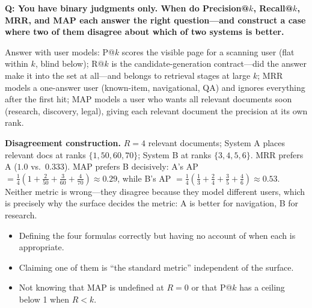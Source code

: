 \begin{interviewq}
\textbf{Q: You have binary judgments only. When do Precision@$k$, Recall@$k$, MRR, and MAP each answer the right question---and construct a case where two of them disagree about which of two systems is better.}

 \quad {} \quad \badgefreq{\freqmed}

\stronganswer

Answer with user models: P@$k$ scores the visible page for a scanning user (flat within $k$, blind below); R@$k$ is the candidate-generation contract---did the answer make it into the set at all---and belongs to retrieval stages at large $k$; MRR models a one-answer user (known-item, navigational, QA) and ignores everything after the first hit; MAP models a user who wants all relevant documents soon (research, discovery, legal), giving each relevant document the precision at its own rank.

\textbf{Disagreement construction.} $R = 4$ relevant documents; System A places relevant docs at ranks $\{1, 50, 60, 70\}$; System B at ranks $\{3, 4, 5, 6\}$. MRR prefers A ($1.0$ vs.\ $0.333$). MAP prefers B decisively: A's AP $= \frac{1}{4}(1 + \frac{2}{50} + \frac{3}{60} + \frac{4}{70}) \approx 0.29$, while B's AP $= \frac{1}{4}(\frac{1}{3} + \frac{2}{4} + \frac{3}{5} + \frac{4}{6}) \approx 0.53$. Neither metric is wrong---they disagree because they model different users, which is precisely why the surface decides the metric: A is better for navigation, B for research.

\redflags
\begin{itemize}
    \item Defining the four formulas correctly but having no account of when each is appropriate.
    \item Claiming one of them is ``the standard metric'' independent of the surface.
    \item Not knowing that MAP is undefined at $R=0$ or that P@$k$ has a ceiling below 1 when $R < k$.
\end{itemize}


\end{interviewq}

